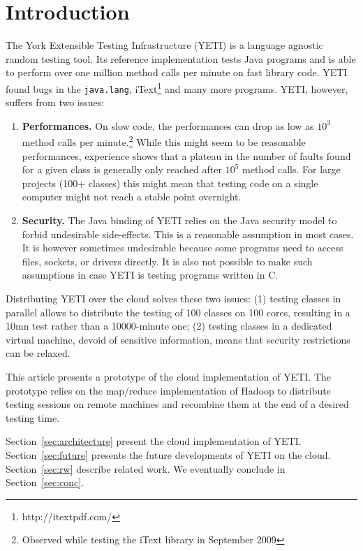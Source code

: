 \section{Introduction}
The York Extensible Testing Infrastructure (YETI) is a language agnostic 
random testing tool. Its reference implementation tests Java programs
and is able to perform over one million method calls per minute on fast library
code. YETI found bugs in the \texttt{java.lang}, iText\footnote{http://itextpdf.com/} and many more 
programs. YETI, however, suffers from two issues:
\begin{enumerate}
\item \textbf{Performances.} On slow code, the performances can drop as low as $10^{3}$
method calls per minute.\footnote{Observed while testing the iText library in 
September 2009} While this might seem to be reasonable performances, experience shows 
that a plateau in the number of faults found for a given class is generally only reached after 
$10^{5}$ method calls. For large projects (100+ classes) this might mean that testing 
code on a single computer might not reach a stable point overnight.
\item \textbf{Security.} The Java binding of YETI relies on the Java security model to forbid 
undesirable side-effects. This is a reasonable assumption in most cases. It is however
sometimes undesirable because some programs need to access files, sockets, or drivers 
directly. It is also not possible to make such assumptions in case YETI is testing 
programs written in C.
\end{enumerate}

Distributing YETI over the cloud solves these two issues: (1) testing classes in parallel
allows to distribute the testing of 100 classes on 100 cores, resulting in a 10mn test 
rather than a 10000-minute one; (2) testing classes in a dedicated virtual machine, devoid of sensitive 
information, means that security restrictions can be relaxed.

This article presents a prototype of the cloud implementation of YETI. The prototype relies
on the map/reduce implementation of Hadoop to distribute testing sessions on remote machines 
and recombine them at the end of a desired testing time.

Section~\ref{sec:architecture} present the cloud implementation of YETI. Section~\ref{sec:future} 
presents the future developments of YETI on the cloud. Section~\ref{sec:rw} describe related work.
We eventually conclude in Section~\ref{sec:conc}.